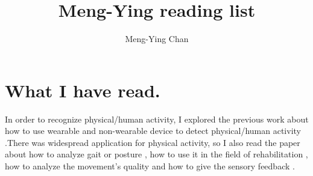 \documentclass[a4paper]{article}
\title{\textbf{Meng-Ying reading list}}
\author{Meng-Ying Chan}
\begin{document}
\maketitle

\section{What I have read.}

In order to recognize physical/human activity, I explored the previous work about how to use wearable and non-wearable device to detect physical/human activity \cite{Muro-de-la-Herran:2014, He:2013, LingBao:2004}.There was widespread application for physical activity, so I also read the  paper about how to analyze gait or posture \cite{Seel:2014, Hung:2013, Benocci:2009} , how to use it in the field of rehabilitation \cite{Chen:2015}, how to analyze the movement's quality \cite{Kikhia:2014, Mentis:2013} and how to give the sensory feedback \cite{Christian:2011, Christian:2012}.


 

\end{document}

